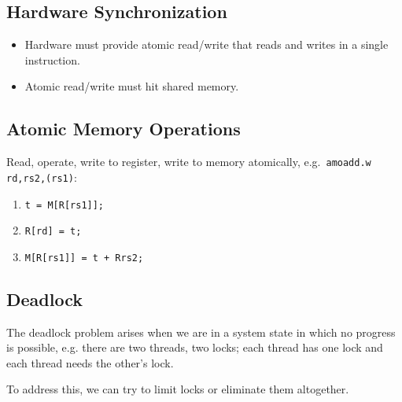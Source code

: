\subsection{Hardware Synchronization}
\begin{itemize}
    \item Hardware must provide atomic read/write that reads and writes in a single instruction.
    \item Atomic read/write must hit shared memory.
\end{itemize}

\subsection{Atomic Memory Operations}
Read, operate, write to register, write to memory atomically, e.g.~\texttt{amoadd.w rd,rs2,(rs1)}:
\begin{enumerate}
	\item \texttt{t = M[R[rs1]];}
	\item \texttt{R[rd] = t;}
	\item \texttt{M[R[rs1]] = t + R{rs2};}
\end{enumerate}

\subsection{Deadlock} 
The deadlock problem arises when we are in a system state in which no progress is possible, e.g. there are two threads, two locks; each thread has one lock and each thread needs the other's lock.

To address this, we can try to limit locks or eliminate them altogether.

